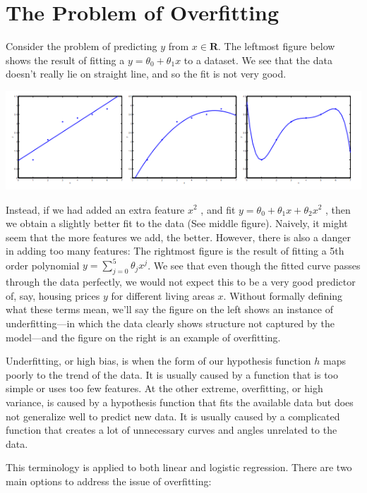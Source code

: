 \documentclass[10pt,a4paper,UTF8]{article}
\begin{document}
\section{The Problem of Overfitting}
\label{sec:org0d9393b}


Consider the problem of predicting \(y\) from \(x\in \mathbf{R}\). The leftmost figure below shows the result of fitting a  \(y= \theta_{0} + \theta_{1}x\) to a dataset. We see that the data doesn’t really lie on straight line, and so the fit is not very good.

\begin{center}
\includegraphics[width=.9\linewidth]{../../img/computer_ng/20171009overfitting.png}
\end{center}

Instead, if we had added an extra feature \(x^{2}\) , and fit \(y = \theta_{0} + \theta_{1}x + \theta_{2}x^{2}\) , then we obtain a slightly better fit to the data (See middle figure). Naively, it might seem that the more features we add, the better. However, there is also a danger in adding too many features: The rightmost figure is the result of fitting a 5th order polynomial \(y=\sum_{j=0}^{5} \theta_{j}x^{j}\). We see that even though the fitted curve passes through the data perfectly, we would not expect this to be a very good predictor of, say, housing prices \(y\) for different living areas \(x\). Without formally defining what these terms mean, we'll say the figure on the left shows an instance of underfitting—in which the data clearly shows structure not captured by the model—and the figure on the right is an example of overfitting.

Underfitting, or high bias, is when the form of our hypothesis function \(h\) maps poorly to the trend of the data. It is usually caused by a function that is too simple or uses too few features. At the other extreme, overfitting, or high variance, is caused by a hypothesis function that fits the available data but does not generalize well to predict new data. It is usually caused by a complicated function that creates a lot of unnecessary curves and angles unrelated to the data.

This terminology is applied to both linear and logistic regression. There are two main options to address the issue of overfitting:
\end{document}
